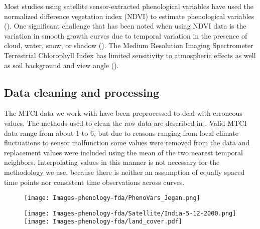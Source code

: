  Most studies using satellite sensor-extracted phenological variables have used the normalized difference vegetation index (NDVI) to estimate phenological variables (\cite{Jeyaseelan:2007dh,Saikia:2009cm}). One significant challenge that has been noted when using NDVI data is the variation in smooth growth curves due to temporal variation in the presence of cloud, water, snow, or shadow (\cite{Goward:1985hr,Huete:2002gy}). The Medium Resolution Imaging Spectrometer Terrestrial Chlorophyll Index has limited sensitivity to atmospheric effects as well as soil background and view angle (\cite{Dash:2010kva}). 

\subsection{Data cleaning and processing} %
\label{sub:data_cleaning_and_processing}

The MTCI data we work with have been preprocessed to deal with erroneous values. The methods used to clean the raw data are described in \cite{Dash:2010kva}. Valid MTCI data range from about 1 to 6, but due to reasons ranging from local climate fluctuations to sensor malfunction some values were removed from the data and replacement values were included using the mean of the two nearest temporal neighbors. Interpolating values in this manner is not necessary for the methodology we use, because there is neither an assumption of equally spaced time points nor consistent time observations across curves.


\begin{figure}
 \centering 
	\texttt{[image: Images-phenology-fda/PhenoVars\_Jegan.png]}  \label{fig:phenology diagram} 
\end{figure}



\begin{figure} 
	\hspace{1.5cm}\texttt{[image: Images-phenology-fda/Satellite/India-5-12-2000.png]}   \\
	\texttt{[image: Images-phenology-fda/land\_cover.pdf]}
	  \label{fig:land cover} 
\end{figure}


